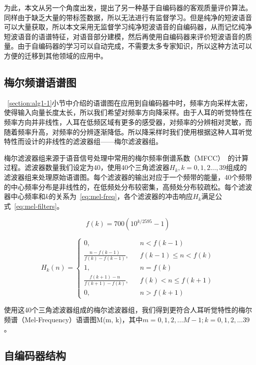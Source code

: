 为此，本文从另一个角度出发，提出了另一种基于自编码器的客观质量评价算法。同样由于缺乏大量的带标签数据，所以无法进行有监督学习。但是纯净的短波语音可以大量获取，所以本文采用无监督学习纯净短波语音的自编码器，从而记忆纯净短波语音的语谱特征，对语音部分建模，然后再使用自编码器来评价短波语音的质量。由于自编码器的学习可以自动完成，不需要太多专家知识，所以这种方法可以方便的迁移到其他领域的应用中。

\subsection{梅尔频谱语谱图}

~\ref{section:alg1-1}小节中介绍的语谱图在应用到自编码器中时，频率方向采样太密，使得输入向量长度太长，所以我们希望对频率方向降采样。由于人耳的听觉特性在频率方向并非线性，人耳在低频区域有更多的感受器，对频率的分辨相对灵敏，而随着频率升高，对频率的分辨逐渐降低。所以降采样时我们使用根据这种人耳听觉特性而设计的非线性的滤波器组——梅尔滤波器组。

梅尔滤波器组来源于语音信号处理中常用的梅尔频率倒谱系数（MFCC）~\cite{tiwari2010mfcc}的计算过程。滤波器数量我们设定为40，使用40个三角滤波器$H_k, k=0,1,2...,39$组成的滤波器组来处理原始语谱图。每个滤波器的输出对应于一个频带的能量，40个频带的中心频率分布是非线性的，在低频处分布较密集，高频处分布较疏松。每个滤波器中心频率和$k$的关系为~\ref{eq:mel-freq}，各个滤波器的冲击响应$H_k$满足公式~\ref{eq:mel-filters}。

\begin{equation}\label{eq:mel-freq}
f(k) = 700(10^{k/2595}-1)
\end{equation}

\begin{equation}\label{eq:mel-filters}
H_k(n) = \left\{
    \begin{array}{rcl}
    0, && {n<f(k-1)} \\
    \frac{n-f(k-1)}{f(k)-f(k-1)}, && {f(k-1)\leq n < f(k)} \\
    1, && {n=f(k)} \\
    \frac{f(k+1)-n}{f(k+1)-f(k)}, && {f(k) < n \leq f(k+1)} \\
    0, && {n > f(k+1)}
    \end{array} \right.
\end{equation}

使用这40个三角滤波器组成的梅尔滤波器组，我们得到更符合人耳听觉特性的梅尔频谱（Mel-Frequency）语谱图M(m, k)，其中$m=0,1,2,...M-1; k=0,1,2,…39$。

\subsection{自编码器结构}

